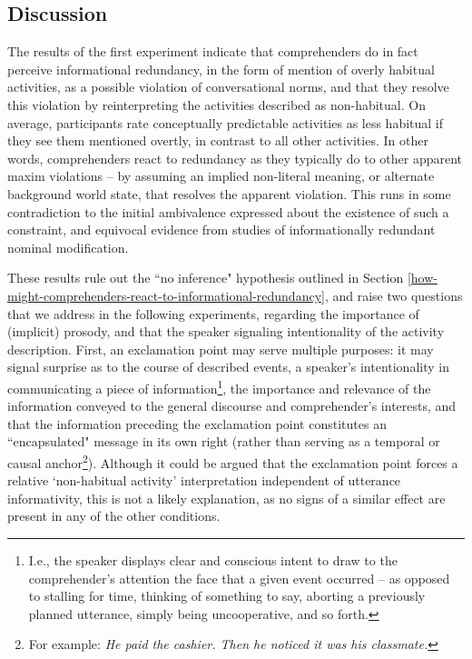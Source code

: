\documentclass{sp}\usepackage[]{graphicx}\usepackage[]{color}
\begin{document}
\subsection{Discussion}

The results of the first experiment indicate that comprehenders do in fact perceive informational redundancy, in the form of mention of overly habitual activities, as a possible violation of conversational norms, and that they resolve this violation by reinterpreting the activities described as non-habitual. On average, participants rate conceptually predictable activities as less habitual if they see them mentioned overtly, in contrast to all other activities. In other words, comprehenders react to redundancy as they typically do to other apparent maxim violations -- by assuming an implied non-literal meaning, or alternate background world state, that resolves the apparent violation. This runs in some contradiction to the initial ambivalence \citet{Grice1975} expressed about the existence of such a constraint, and equivocal evidence from studies of informationally redundant nominal modification. 

These results rule out the ``no inference" hypothesis outlined in Section \ref{how-might-comprehenders-react-to-informational-redundancy}, and raise two questions that we address in the following experiments, regarding the importance of (implicit) prosody, and that the speaker signaling intentionality of the activity description. First, an exclamation point may serve multiple purposes: it may signal surprise as to the course of described events, a speaker's intentionality in communicating a piece of information\footnote{I.e., the speaker displays clear and conscious intent to draw to the comprehender's attention the face that a given event occurred – as opposed to stalling for time, thinking of something to say, aborting a previously planned utterance, simply being uncooperative, and so forth.}, the importance and relevance of the information conveyed to the general discourse and comprehender's interests, and that the information preceding the exclamation point constitutes an ``encapsulated" message in its own right (rather than serving as a temporal or causal anchor\footnote{For example: \textit{He paid the cashier. Then he noticed it was his classmate.}}). Although it could be argued that the exclamation point \citep[often a signal of surprise;][]{Rett2011} forces a relative `non-habitual activity' interpretation independent of utterance informativity, this is not a likely explanation, as no signs of a similar effect are present in any of the other conditions. 
\end{document}
